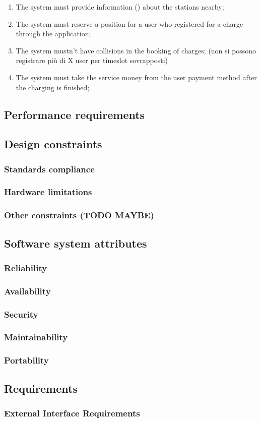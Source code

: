 \begin{enumerate}[label=\textbf{R\arabic*}]
    \item The system must provide information () about the stations nearby;
    \item The system must reserve a position for a user who registered for a charge through the application;
    \item The system mustn't have collisions in the booking of charges; (non si possono registrare più di X user per timeslot sovrapposti)
    \item The system must take the service money from the user payment method after the charging is finished;
\end{enumerate}
\subsection{Performance requirements}

\subsection{Design constraints}
\subsubsection{Standards compliance}
\subsubsection{Hardware limitations}
\subsubsection{Other constraints (TODO MAYBE)}

\subsection{Software system attributes}
\subsubsection{Reliability}
\subsubsection{Availability}
\subsubsection{Security}
\subsubsection{Maintainability}
\subsubsection{Portability}
\subsection{Requirements}
\subsubsection{External Interface Requirements}
\clearpage